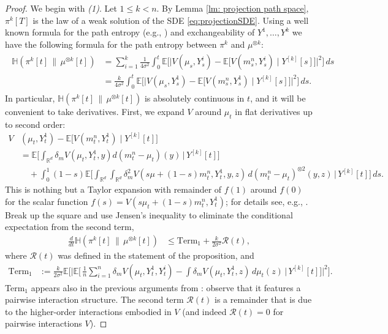 \documentclass[11pt,reqno]{amsart}
\numberwithin{equation}{section}
\theoremstyle{definition}
\def\E{{\mathbb E}}
\def\R{{\mathbb R}}
\newcommand{\ent}{ \mathbb H}
\begin{document}
\begin{proof}
We begin with \textit{(1)}. Let $1 \le k < n$. By Lemma \ref{lm: projection path space}, $\pi^k[T]$ is the law of a weak solution of the SDE \eqref{eq:projectionSDE}. Using a well known formula for the path entropy (e.g., \cite[Lemma 4.4]{HierarchiesPaper}) and exchangeability of $Y^1,\dots,Y^k$ we have the following formula for the path entropy between $\pi^k$ and $\mu^{\otimes k}$:
\begin{align}
\begin{split}
    \label{eq: entropy in terms of L2}
    \ent(\pi^k[t]\,\|\,\mu^{\otimes k}[t])&=\sum_{i=1}^k\frac{1}{4\sigma^2}\int_0^t \E\bigg[\Big | V(\mu_s,Y_s^i)-\E\big[ V(m_s^n,Y_s^i)\mid Y^{[k]}[s]\big]\Big |^2\bigg]\,ds\\
    &=\frac{k}{4\sigma^2}\int_0^t \E\bigg[\Big | V(\mu_s,Y_s^1)-\E\big[ V(m_s^n,Y_s^1)\mid Y^{[k]}[s]\big]\Big |^2\bigg]\,ds.
    \end{split}
    \end{align}
    In particular, $\ent(\pi^k[t]\,\|\,\mu^{\otimes k}[t])$ is absolutely continuous in $t$, and it will be convenient to take derivatives. First, we expand $V$ around $\mu_t$ in flat derivatives up to second order:
\begin{align*}
V&(\mu_t,Y_t^1) - \E\Big[ V(m_t^n,Y_t^1)\mid Y^{[k]}[t]\Big] \\
    &= \E \Big[\int_{\R^d} \delta_m  V(\mu_t,Y_t^1,y)d(m_t^n-\mu_t)(y)\,\Big \vert\, Y^{[k]}[t]\Big]\\
    &\quad + \int_0^1(1-s)\E\Big[\int_{\R^d}\int_{\R^d}\delta_m^2  V(s\mu+(1-s)m_t^n,Y_t^1,y,z)\,d(m_t^n-\mu_t)^{\otimes 2}(y,z)\,\Big\vert\,Y^{[k]}[t]\Big]\,ds.
\end{align*}
This is nothing but a Taylor expansion with remainder of $f(1)$ around $f(0)$ for the scalar function $f(s)=V(s\mu_t+(1-s)m_t^n,Y_t^1)$; for details see, e.g., \cite[Lemma 2.2]{Chassagneux2022-jt}. Break up the square and use Jensen's inequality to eliminate the conditional expectation from the second term,
\begin{align}
\label{eq: entropy first bound} 
\frac{d}{dt}\ent(\pi^k [t]\,\|\,\mu^{\otimes k}[t])
    &\leq  \text{Term}_1+\frac{k}{2\sigma^2}\mathcal R(t),
\end{align}
where $\mathcal R(t)$ was defined in the statement of the proposition, and
\begin{align*}
 \text{Term}_1 &:= \frac{k}{2\sigma^2} \E\bigg[\Big|\E\Big[\,\frac{1}{n}\sum_{i=1}^n \delta_m  V(\mu_t,Y_t^1,Y_t^i)-\int \delta_m  V(\mu_t,Y_t^1,z)\,d\mu_t(z)\,\Big\vert\,Y^{[k]}[t]\Big]\Big|^2\bigg].
\end{align*}
Term$_1$ appears also in the previous arguments from \cite{HierarchiesPaper}: observe that it features a pairwise interaction structure. The second term $\mathcal R(t)$ is a remainder that is due to the higher-order interactions embodied in $ V$ (and indeed $\mathcal R(t)=0$ for pairwise interactions $V$). 


\end{proof}
\end{document}
